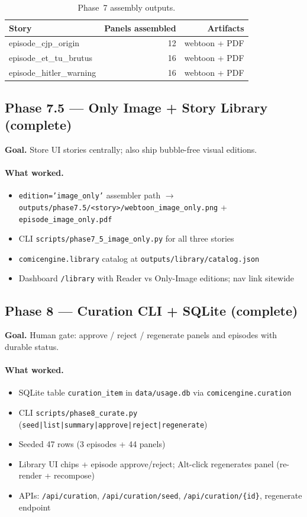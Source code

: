 \documentclass[10pt,twocolumn,letterpaper]{article}
\begin{document}
\begin{table}[t]
\centering
\caption{Phase~7 assembly outputs.}
\label{tab:p7}
\small
\begin{tabular}{@{}lrr@{}}
\toprule
Story & Panels assembled & Artifacts \\
\midrule
episode\_cjp\_origin & 12 & webtoon + PDF \\
episode\_et\_tu\_brutus & 16 & webtoon + PDF \\
episode\_hitler\_warning & 16 & webtoon + PDF \\
\bottomrule
\end{tabular}
\end{table}

\subsection{Phase 7.5 --- Only Image + Story Library (complete)}
\textbf{Goal.} Store UI stories centrally; also ship bubble-free visual editions.

\paragraph{What worked.}
\begin{itemize}[leftmargin=*,itemsep=1pt]
  \item \texttt{edition='image\_only'} assembler path $\rightarrow$ \texttt{outputs/phase7.5/<story>/webtoon\_image\_only.png} + \texttt{episode\_image\_only.pdf}
  \item CLI \texttt{scripts/phase7\_5\_image\_only.py} for all three stories
  \item \texttt{comicengine.library} catalog at \texttt{outputs/library/catalog.json}
  \item Dashboard \texttt{/library} with Reader vs Only-Image editions; nav link sitewide
\end{itemize}

\subsection{Phase 8 --- Curation CLI + SQLite (complete)}
\textbf{Goal.} Human gate: approve / reject / regenerate panels and episodes with durable status.

\paragraph{What worked.}
\begin{itemize}[leftmargin=*,itemsep=1pt]
  \item SQLite table \texttt{curation\_item} in \texttt{data/usage.db} via \texttt{comicengine.curation}
  \item CLI \texttt{scripts/phase8\_curate.py} (\texttt{seed|list|summary|approve|reject|regenerate})
  \item Seeded 47 rows (3 episodes + 44 panels)
  \item Library UI chips + episode approve/reject; Alt-click regenerates panel (re-render + recompose)
  \item APIs: \texttt{/api/curation}, \texttt{/api/curation/seed}, \texttt{/api/curation/\{id\}}, regenerate endpoint
\end{itemize}
\end{document}
